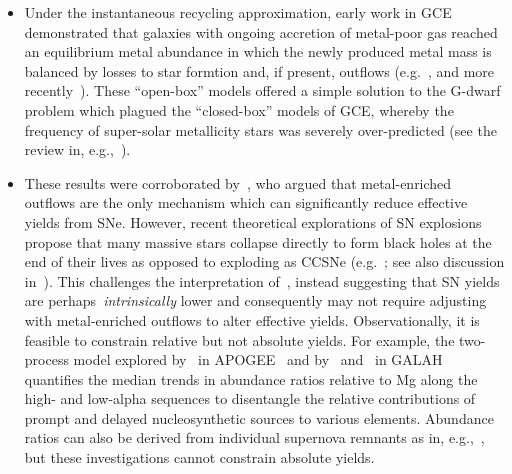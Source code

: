\documentclass[ms.tex]{subfiles}
\begin{document}
\begin{itemize}

	\item Under the instantaneous recycling approximation, early work in GCE
	demonstrated that galaxies with ongoing accretion of metal-poor gas
	reached an equilibrium metal abundance in which the newly produced metal
	mass is balanced by losses to star formtion and, if present, outflows
	(e.g.~\citealp{Larson1972}, and more recently~\citealp{Weinberg2017}).
	These ``open-box'' models offered a simple solution to the G-dwarf problem
	which plagued the ``closed-box'' models of GCE, whereby the frequency of
	super-solar metallicity stars was severely over-predicted (see the review
	in, e.g.,~\citealp{Tinsley1980}).

	\item These results were corroborated by~\citet{Dalcanton2007}, who argued
	that metal-enriched outflows are the only mechanism which can
	significantly reduce effective yields from SNe.
	However, recent theoretical explorations of SN explosions propose that
	many massive stars collapse directly to form black holes at the end of
	their lives as opposed to exploding as CCSNe (e.g.~\citealp{Ertl2016,
	Sukhbold2016}; see also discussion in~\citealp{Griffith2021}).
	This challenges the interpretation of~\citet{Dalcanton2007}, instead
	suggesting that SN yields are perhaps~\textit{intrinsically} lower and
	consequently may not require adjusting with metal-enriched outflows to
	alter effective yields.
	Observationally, it is feasible to constrain relative but not absolute
	yields.
	For example, the two-process model explored by~\citet{Weinberg2019,
	Weinberg2021} in APOGEE~\citep{Majewski2017} and by~\citet*{Griffith2019}
	and~\citet{Griffith2022} in GALAH~\mbox{\citep{DeSilva2015, Martell2017}}
	quantifies the median trends in abundance ratios relative to Mg along the
	high- and low-alpha sequences to disentangle the relative contributions of
	prompt and delayed nucleosynthetic sources to various elements.
	Abundance ratios can also be derived from individual supernova remnants as
	in, e.g.,~\citet*{Holland-Ashford2020}, but these investigations cannot
	constrain absolute yields.


\end{itemize}
\end{document}
